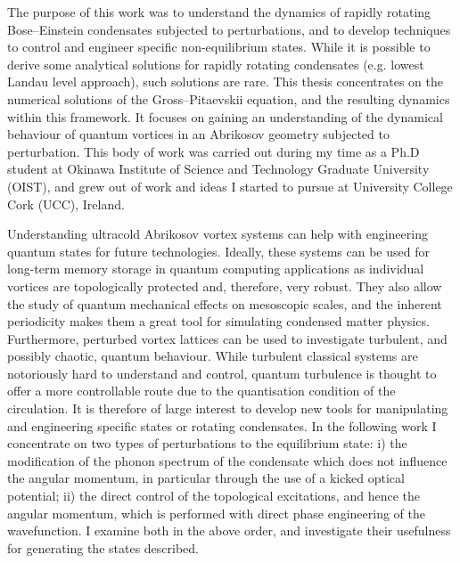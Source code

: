 
The purpose of this work was to understand the dynamics of rapidly rotating Bose--Einstein condensates subjected to perturbations, and to develop techniques to control and engineer specific non-equilibrium states. While it is possible to derive some analytical solutions for rapidly rotating condensates (e.g. lowest Landau level approach), such solutions are rare. This thesis concentrates on the numerical solutions of the Gross--Pitaevskii equation, and the resulting dynamics within this framework. It focuses on gaining an understanding of the dynamical behaviour of quantum vortices in an Abrikosov geometry subjected to perturbation. %
This body of work was carried out during my time as a Ph.D student at Okinawa Institute of Science and Technology Graduate University (OIST), and grew out of work and ideas I started to pursue at University College Cork (UCC), Ireland.

Understanding ultracold Abrikosov vortex systems can help with engineering quantum states for future technologies. Ideally, these systems can be used for long-term memory storage in quantum computing applications as individual vortices are topologically protected and, therefore, very robust. They also allow the study of quantum mechanical effects on mesoscopic scales, and the inherent periodicity makes them a great tool for simulating condensed matter physics. Furthermore, perturbed vortex lattices can be used to investigate turbulent, and possibly chaotic, quantum behaviour. While turbulent classical systems are notoriously hard to understand and control, quantum turbulence is thought to offer a more controllable route due to the quantisation condition of the circulation. It is therefore of large interest to develop new tools for manipulating and engineering specific states or rotating condensates. In the following work I concentrate on two types of perturbations to the equilibrium state: i) the modification of the phonon spectrum of the condensate which does not influence the angular momentum, in particular through the use of a kicked optical potential; ii) the direct control of the topological excitations, and hence the angular momentum, which is performed with direct phase engineering of the wavefunction. I examine both in the above order, and investigate their usefulness for generating the states described.

